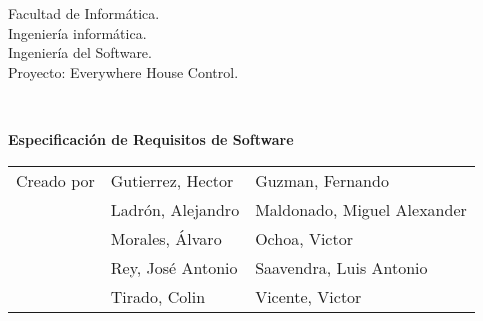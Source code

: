 \begin{titlepage}
\begin{scriptsize}\noindent Facultad de Informática.\\
Ingeniería informática.\\
Ingeniería del Software.\\
Proyecto: Everywhere House Control.
\end{scriptsize}\\
\vfill
\begin{center}
    \begin{Large}
        \textbf{Especificación de Requisitos de Software}
    \end{Large}
\end{center}
\vfill
\begin{flushright}
\begin{scriptsize}
    \begin{tabular}{lll}
    Creado por & Gutierrez, Hector & Guzman, Fernando  \\
         & Ladrón, Alejandro & Maldonado, Miguel Alexander \\
         & Morales, Álvaro & Ochoa, Victor \\
         & Rey, José Antonio & Saavendra, Luis Antonio  \\
         & Tirado, Colin & Vicente, Victor \\
    \end{tabular}
\end{scriptsize}
\end{flushright}
\end{titlepage}
\thispagestyle{empty}
\cleardoublepage
\newpage


\tableofcontents
\newpage
\thispagestyle{empty}
\cleardoublepage
\newpage
{}
\raggedbottom
{}




